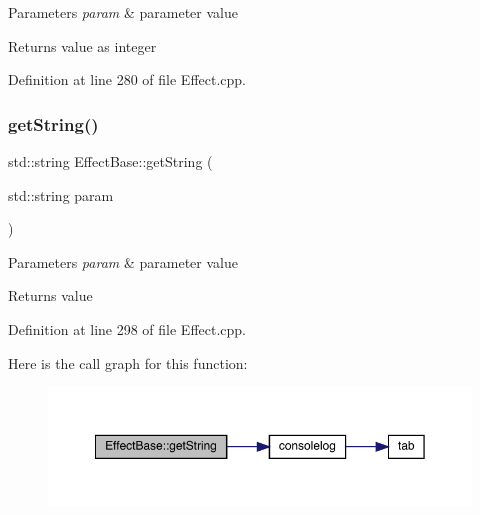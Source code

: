 \begin{DoxyParams}{Parameters}
{\em param} & parameter value \\
\hline
\end{DoxyParams}
\begin{DoxyReturn}{Returns}
value as integer 
\end{DoxyReturn}


Definition at line 280 of file Effect.\+cpp.

\mbox{\label{class_effect_base_a74b8d00a78daa5a33db20543564c7350}} 
\subsubsection{\texorpdfstring{get\+String()}{getString()}}
{\footnotesize\ttfamily std\+::string Effect\+Base\+::get\+String (\begin{DoxyParamCaption}\item[{std\+::string}]{param }\end{DoxyParamCaption})\hspace{0.3cm}{\ttfamily [static]}}


\begin{DoxyParams}{Parameters}
{\em param} & parameter value \\
\hline
\end{DoxyParams}
\begin{DoxyReturn}{Returns}
value 
\end{DoxyReturn}


Definition at line 298 of file Effect.\+cpp.

Here is the call graph for this function\+:
\nopagebreak
\begin{figure}[H]
\begin{center}
\leavevmode
\includegraphics[width=350pt]{class_effect_base_a74b8d00a78daa5a33db20543564c7350_cgraph}
\end{center}
\end{figure}


